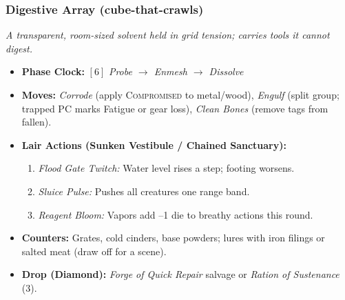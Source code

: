 \subsubsection*{Digestive Array (cube-that-crawls)}
\textit{A transparent, room-sized solvent held in grid tension; carries tools it cannot digest.}
\begin{itemize}
  \item \textbf{Phase Clock:} \([6]\) \emph{Probe \(\rightarrow\) Enmesh \(\rightarrow\) Dissolve}
  \item \textbf{Moves:} \emph{Corrode} (apply \textsc{Compromised} to metal/wood), \emph{Engulf} (split group; trapped PC marks Fatigue or gear loss), \emph{Clean Bones} (remove tags from fallen).
  \item \textbf{Lair Actions (Sunken Vestibule / Chained Sanctuary):}
  \begin{enumerate}\item \emph{Flood Gate Twitch:} Water level rises a step; footing worsens.\item \emph{Sluice Pulse:} Pushes all creatures one range band.\item \emph{Reagent Bloom:} Vapors add --1 die to breathy actions this round. \end{enumerate}
  \item \textbf{Counters:} Grates, cold cinders, base powders; lures with iron filings or salted meat (draw off for a scene).
  \item \textbf{Drop (Diamond):} \emph{Forge of Quick Repair} salvage or \emph{Ration of Sustenance} (3).
\end{itemize}

